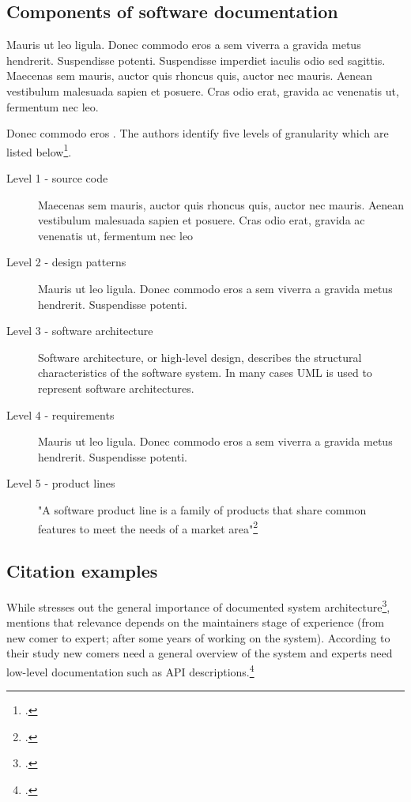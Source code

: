 \subsection{Components of software documentation}
Mauris ut leo ligula. Donec commodo eros a sem viverra a gravida metus
hendrerit. Suspendisse potenti. Suspendisse imperdiet iaculis odio sed
sagittis. Maecenas sem mauris, auctor quis rhoncus quis, auctor nec mauris.
Aenean vestibulum malesuada sapien et posuere. Cras odio erat, gravida ac
venenatis ut, fermentum nec leo.

Donec commodo eros . The
authors identify five levels of granularity which are listed
below\footcite[Cf.][98]{huang_towards_2003}.

\begin{description}
	\item[Level 1 - source code] Maecenas sem mauris, auctor quis rhoncus
	     quis, auctor nec mauris. Aenean vestibulum malesuada sapien et
	     posuere. Cras odio erat, gravida ac venenatis ut, fermentum nec
	     leo

	\item[Level 2 - design patterns] Mauris ut leo ligula. Donec commodo
	     eros a sem viverra a gravida metus hendrerit. Suspendisse
	     potenti.

	\item[Level 3 - software architecture] Software architecture, or
	     high-level design, describes the structural characteristics of the
	     software system. In many cases UML is used to represent software
	     architectures.

	\item[Level 4 - requirements] Mauris ut leo ligula. Donec commodo eros
	     a sem viverra a gravida metus hendrerit. Suspendisse potenti.

	\item[Level 5 - product lines] "A software product line is a family of
	     products that share common features to meet the needs of a market
	     area"\footcite[][]{ardis_et_al_2000}
\end{description}


\subsection{Citation examples}
\label{sec:relevance_of_documentation}


While \citeauthor{tilley_1992} stresses out the general importance of documented
system architecture\footcite[Cf.][]{tilley_1992}, 
\citeauthor{cioch_96} mentions that relevance depends on the
maintainers stage of experience (from new comer to expert; after some years of
working on the system). According to their study new comers need a general
overview of the system and experts need low-level documentation such as API
descriptions.\footcite[Cf.][]{cioch_96}

